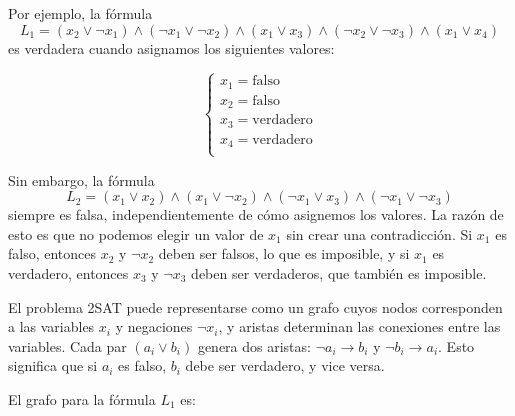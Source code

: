 Por ejemplo, la fórmula
\[
    L_1 = (x_2 \lor \lnot x_1) \land
    (\lnot x_1 \lor \lnot x_2) \land
    (x_1 \lor x_3) \land
    (\lnot x_2 \lor \lnot x_3) \land
    (x_1 \lor x_4)
\]
es verdadera cuando asignamos los siguientes valores:

\[
    \begin{cases}
        x_1 = \textrm{falso}     \\
        x_2 = \textrm{falso}     \\
        x_3 = \textrm{verdadero} \\
        x_4 = \textrm{verdadero} \\
    \end{cases}
\]

Sin embargo, la fórmula
\[
    L_2 = (x_1 \lor x_2) \land
    (x_1 \lor \lnot x_2) \land
    (\lnot x_1 \lor x_3) \land
    (\lnot x_1 \lor \lnot x_3)
\]
siempre es falsa, independientemente de cómo asignemos los valores.
La razón de esto es que no podemos elegir un valor de $x_1$ sin
crear una contradicción. Si $x_1$ es falso, entonces $x_2$ y
$\lnot x_2$ deben ser falsos, lo que es imposible, y si $x_1$ es
verdadero, entonces $x_3$ y $\lnot x_3$ deben ser verdaderos, que
también es imposible.

El problema 2SAT puede representarse como un grafo cuyos nodos
corresponden a las variables $x_i$ y negaciones $\lnot x_i$, y aristas
determinan las conexiones entre las variables. Cada par $(a_i \lor b_i)$
genera dos aristas: $\lnot a_i \to b_i$ y $\lnot b_i \to a_i$.
Esto significa que si $a_i$ es falso, $b_i$ debe ser verdadero, y
vice versa.

El grafo para la fórmula $L_1$ es:

\begin{center}
\end{center}

